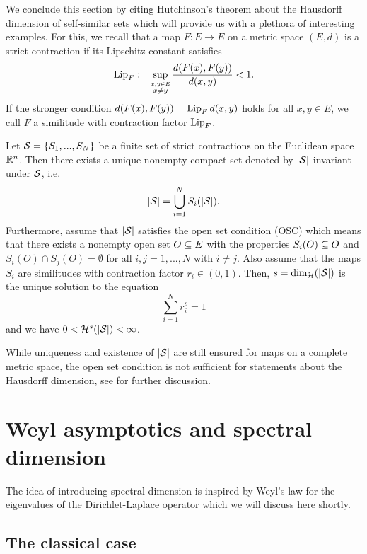 We conclude this section by citing Hutchinson's theorem about the Hausdorff dimension of self-similar sets which will provide us with a plethora of interesting examples. For this, we recall that a map $F:E\to E$ on a metric space $(E,d)$ is a strict contraction if its Lipschitz constant satisfies
\[
  \operatorname{Lip}_F:=\sup_{\stackrel{x,y\in E}{x\neq y}}\frac{d(F(x),F(y))}{d(x,y)}<1.
\]
If the stronger condition $d(F(x),F(y))=\operatorname{Lip}_F d(x,y)$ holds for all $x,y\in E$, we call $F$ a similitude with contraction factor $\operatorname{Lip}_F$.
\begin{thm}\label{thm:hutchinson}
  Let $\mathcal{S}=\{S_1,...,S_N\}$ be a finite set of strict contractions on the Euclidean space $\mathbb{R}^n$. Then there exists a unique nonempty compact set denoted by $|\mathcal{S}|$ invariant under $\mathcal{S}$, i.e.
  \[
    |\mathcal{S}|=\bigcup_{i=1}^N S_i(|\mathcal{S}|).
  \]
  Furthermore, assume that $|\mathcal{S}|$ satisfies the open set condition (OSC) which means that there exists a nonempty open set $O\subseteq E$ with the properties $S_i(O)\subseteq O$ and $S_i(O)\cap S_j(O)=\emptyset$ for all $i,j=1,...,N$ with $i\neq j$. Also assume that the maps $S_i$ are similitudes with contraction factor $r_i\in(0,1)$. Then, $s=\dim_{\mathcal{H}}(|\mathcal{S}|)$ is the unique solution to the equation
  \[
    \sum_{i=1}^N r_i^s=1
  \]
  and we have $0<\mathcal{H}^s(|\mathcal{S}|)<\infty$. 
\end{thm}
While uniqueness and existence of $|\mathcal{S}|$ are still ensured for maps on a complete metric space, the open set condition is not sufficient for statements about the Hausdorff dimension, see \cite{schief1996self} for further discussion. 



\section{Weyl asymptotics and spectral dimension}

The idea of introducing spectral dimension is inspired by Weyl's law for the eigenvalues of the Dirichlet-Laplace operator which we will discuss here shortly.

\subsection{The classical case}

